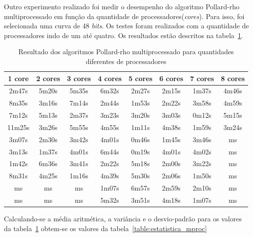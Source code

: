 Outro experimento realizado foi medir o desempenho do algoritmo Pollard-rho multiprocessado em função da quantidade de processadores(\textit{cores}). Para isso, foi selecionada uma curva de 48 \textit{bits}. Os testes foram realizados com a quantidade de processadores indo de um até quatro. Os resultados estão descritos na tabela~\ref{table:results_mproc}.

\begin{table}[h]
\centering
\begin{tabular}{|c|c|c|c|c|c|c|c|}
\hline
\rowcolor[gray]{0.9}
\textbf{1 core}  & \textbf{2 cores} & \textbf{3 cores} & \textbf{4 cores} & \textbf{5 cores} & \textbf{6 cores} & \textbf{7 cores} & \textbf{8 cores}\\ \hline
2m47s    & 5m20s   & 5m35s   & 6m32s   & 2m27s   & 2m15s   & 1m37s   & 4m46s \\ \hline
8m35s    & 3m16s   & 7m14s   & 2m44s   & 1m53s   & 2m22s   & 3m58s   & 4m59s \\ \hline
7m12s    & 5m13s   & 2m37s   & 3m23s   & 3m20s   & 3m03s   & 0m12s   & 5m15s \\ \hline
11m25s   & 3m26s   & 5m55s   & 4m55s   & 1m11s   & 4m38s   & 1m59s   & 3m24s \\ \hline
3m07s    & 2m30s   & 3m42s   & 4m01s   & 0m46s   & 1m45s   & 3m46s   & ms \\ \hline
3m13s    & 1m37s   & 4m01s   & 6m44s   & 0m19s   & 4m01s   & 4m02s   & ms \\ \hline
1m42s    & 6m36s   & 3m41s   & 2m22s   & 5m18s   & 2m00s   & 3m22s   & ms \\ \hline
8m31s    & 4m25s   & 1m16s   & 4m39s   & 5m30s   & 2m06s   & 1m50s   & ms \\ \hline
ms    & ms   & ms   & 1m07s   & 6m57s   & 2m59s   & 2m10s   & ms \\ \hline
ms    & ms   & ms   & 5m32s   & 3m51s   & 4m18s   & 1m07s   & ms \\ \hline
\end{tabular}
\caption{Resultado dos algoritmos Pollard-rho multiprocessado para quantidades diferentes de processadores}
\label{table:results_mproc}
\end{table}

Calculando-se a média aritmética, a variância e o desvio-padrão para os valores da tabela~\ref{table:results_mproc} obtem-se os valores da tabela~\ref{table:estatistica_mproc}

